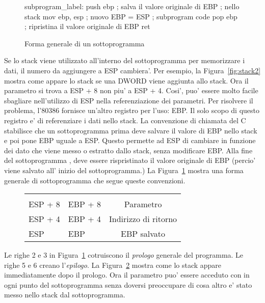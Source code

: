\begin{figure}[t]
\begin{AsmCodeListing}[frame=single]
subprogram_label:
      push   ebp           ; salva il valore originale di EBP
                           ; nello stack
      mov    ebp, esp      ; nuovo EBP = ESP
; subprogram code
      pop    ebp           ; ripristina il valore originale di EBP
      ret
\end{AsmCodeListing}
\caption{Forma generale di un sottoprogramma \label{fig:subskel1}}
\end{figure}

Se lo stack viene utilizzato all'interno del sottoprogramma per 
memorizzare i dati, il numero da aggiungere a ESP cambiera'. Per
esempio, la Figura~\ref{fig:stack2} mostra come appare lo 
stack se una DWORD viene aggiunta allo stack. Ora il parametro si
trova a {\code ESP + 8} non piu' a {\code ESP + 4}. Cosi', puo' essere
molto facile sbagliare nell'utilizzo di ESP nella referenziazione
dei parametri. Per risolvere il problema, l'80386 fornisce un'altro
registro per l'uso: EBP. Il solo scopo di questo registro e' di 
referenziare i dati nello stack. La convenzione di chiamata del C
stabilisce che un sottoprogramma prima deve salvare il valore di EBP 
nello stack e poi pone EBP uguale a ESP. Questo permette ad ESP di
cambiare in funzione dei dato che viene messo o estratto dallo stack,
senza modificare EBP. Alla fine del sottoprogramma , deve essere
rispristinato il valore originale di EBP (percio' viene salvato all'
inizio del sottoprogramma.) La Figura~\ref{fig:subskel1} mostra una
forma generale di sottoprogramma che segue queste convenzioni. 

\begin{figure}[t]
\centering
\begin{tabular}{ll|c|}
\cline{3-3}
&  & \\ \cline{3-3}
ESP + 8 & EBP + 8 & Parametro \\ \cline{3-3}
ESP + 4 & EBP + 4 & Indirizzo di ritorno \\ \cline{3-3}
ESP     & EBP     & EBP salvato \\ \cline{3-3}
\end{tabular}
\caption{}
\label{fig:stack3}
\end{figure}

Le righe 2 e 3 in Figura~\ref{fig:subskel1} cotruiscono il \emph{prologo} 
generale del programma. Le righe 5 e 6 creano l'\emph{epilogo}.
La Figura~\ref{fig:stack3} mostra come lo stack appare immediatamente
dopo il prologo. Ora il parametro puo' essere acceduto con {\code [EBP + 8]}
in ogni punto del sottoprogramma senza doversi preoccupare di cosa
altro e' stato messo nello stack dal sottoprogramma.

